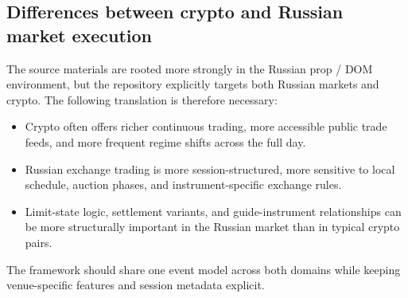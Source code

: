 \subsection{Differences between crypto and Russian market execution}

The source materials are rooted more strongly in the Russian prop / DOM environment, but the
repository explicitly targets both Russian markets and crypto. The following translation is
therefore necessary:

\begin{itemize}[leftmargin=1.4em]
  \item Crypto often offers richer continuous trading, more accessible public trade feeds, and more
        frequent regime shifts across the full day.
  \item Russian exchange trading is more session-structured, more sensitive to local schedule,
        auction phases, and instrument-specific exchange rules.
  \item Limit-state logic, settlement variants, and guide-instrument relationships can be more
        structurally important in the Russian market than in typical crypto pairs.
\end{itemize}

The framework should share one event model across both domains while keeping venue-specific
features and session metadata explicit.
